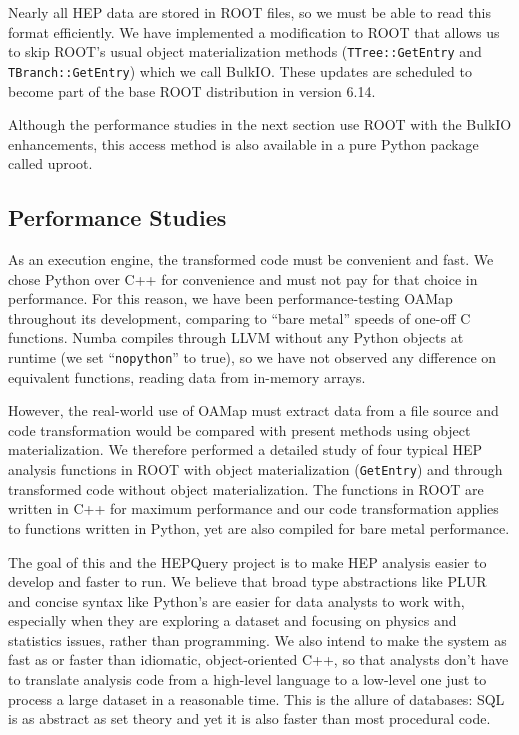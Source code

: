 \documentclass[10pt, conference, compsocconf]{IEEEtran}
\begin{document}
Nearly all HEP data are stored in ROOT files, so we must be able to read this format efficiently. We have implemented a modification to ROOT that allows us to skip ROOT's usual object materialization methods ({\tt TTree::GetEntry} and {\tt TBranch::GetEntry}) which we call BulkIO. These updates are scheduled to become part of the base ROOT distribution in version 6.14.

Although the performance studies in the next section use ROOT with the BulkIO enhancements, this access method is also available in a pure Python package called uproot\cite{uproot}.

\subsection{Performance Studies}

As an execution engine, the transformed code must be convenient and fast. We chose Python over C++ for convenience and must not pay for that choice in performance. For this reason, we have been performance-testing OAMap throughout its development, comparing to ``bare metal'' speeds of one-off C functions. Numba compiles through LLVM without any Python objects at runtime (we set ``{\tt nopython}'' to true), so we have not observed any difference on equivalent functions, reading data from in-memory arrays.

However, the real-world use of OAMap must extract data from a file source and code transformation would be compared with present methods using object materialization. We therefore performed a detailed study of four typical HEP analysis functions in ROOT with object materialization ({\tt GetEntry}) and through transformed code without object materialization. The functions in ROOT are written in C++ for maximum performance and our code transformation applies to functions written in Python, yet are also compiled for bare metal performance. 





The goal of this and the HEPQuery project is to make HEP analysis easier to develop and faster to run. We believe that broad type abstractions like PLUR and concise syntax like Python's are easier for data analysts to work with, especially when they are exploring a dataset and focusing on physics and statistics issues, rather than programming. We also intend to make the system as fast as or faster than idiomatic, object-oriented C++, so that analysts don't have to translate analysis code from a high-level language to a low-level one just to process a large dataset in a reasonable time. This is the allure of databases: SQL is as abstract as set theory and yet it is also faster than most procedural code.
\end{document}
